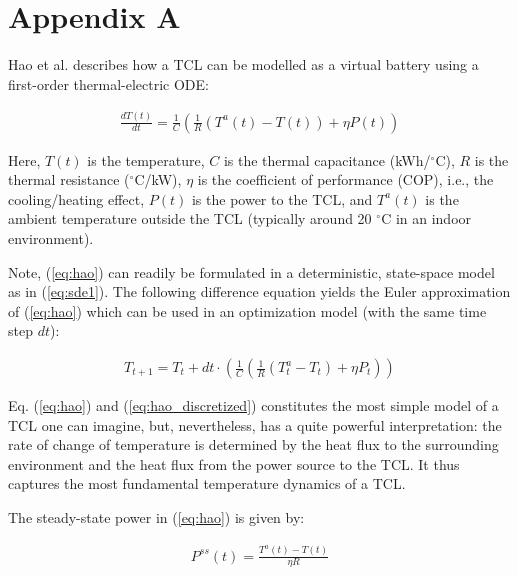 {\appendices
\section*{Appendix A}\label{appendix:A}

Hao et al. \cite{hao2014aggregate} describes how a TCL can be modelled as a virtual battery using a first-order thermal-electric ODE:

\begin{align}\label{eq:hao}
    \frac{dT(t)}{dt} = \frac{1}{C}\left( \frac{1}{R}(T^{a}(t) - T(t)) + \eta P(t) \right)
\end{align}

Here, $T(t)$ is the temperature, $C$ is the thermal capacitance (kWh/$^{\circ}$C), $R$ is the thermal resistance ($^{\circ}$C/kW), $\eta$ is the coefficient of performance (COP), i.e., the cooling/heating effect, $P(t)$ is the power to the TCL, and $T^{a}(t)$ is the ambient temperature outside the TCL (typically around 20 $^{\circ}$C in an indoor environment).

Note, (\ref{eq:hao}) can readily be formulated in a deterministic, state-space model as in (\ref{eq:sde1}). The following difference equation yields the Euler approximation of (\ref{eq:hao}) which can be used in an optimization model (with the same time step $dt$):

\begin{align}\label{eq:hao_discretized}
    T_{t+1} = T_t + dt\cdot \left( \frac{1}{C}\left( \frac{1}{R}(T^{a}_t - T_t) + \eta P_t \right)  \right)
\end{align}

Eq. (\ref{eq:hao}) and (\ref{eq:hao_discretized}) constitutes the most simple model of a TCL one can imagine, but, nevertheless, has a quite powerful interpretation: the rate of change of temperature is determined by the heat flux to the surrounding environment and the heat flux from the power source to the TCL. It thus captures the most fundamental temperature dynamics of a TCL.

The steady-state power in (\ref{eq:hao}) is given by:

\begin{align}\label{eq:hao_ss}
    P^{ss}(t) = \frac{T^{a}(t) - T(t)}{\eta R}
\end{align}

}
